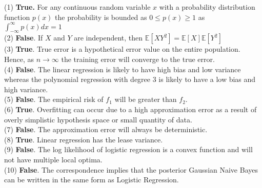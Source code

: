 	(1) \textbf{True.} For any continuous random variable $x$ with a probability distribution function $p(x)$ the probability is bounded as $0 \leq p(x) \geq 1$ as $\int_{-\infty}^{\infty}p(x)dx = 1$ \\
	
	
	(2) \textbf{False}. If $X$ and $Y$ are independent, then $\mathbb{E}[XY^{2}] = \mathbb{E}[X]\mathbb{E}[Y^2]$ \\
	
	
	(3) \textbf{True}. True error is a hypothetical error value on the entire population. Hence, as $n \rightarrow \infty$ the training error will converge to the true error. \\
	
	
	(4) \textbf{False}. The linear regression is likely to have high bias and low variance whereas the polynomial regression with degree 3 is likely to have a low bias and high variance. \\
	
	
	(5) \textbf{False}. The empirical risk of $f_{1}$ will be greater than $f_{2}$. \\
	
	(6) \textbf{True}. Overfitting can occur due to a high approximation error as a result of overly simplistic hypothesis space or small quantity of data. \\
	
	
	(7) \textbf{False}. The approximation error will always be deterministic. \\
	
	
	(8) \textbf{True}. Linear regression has the lease variance. \\
	
	
	(9) \textbf{False}. The log likelihood of logistic regression is a convex function and will not have multiple local optima. \\
	
	
	(10) \textbf{False}. The correspondence implies that the posterior Gaussian Naive Bayes can be written in the same form as Logistic Regression.
